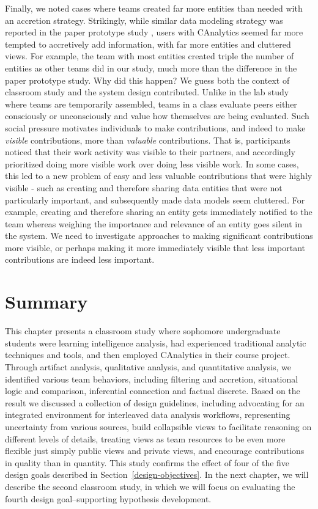 Finally, we noted cases where teams created far more entities than needed with an
accretion strategy. Strikingly, while similar data modeling strategy was
reported in the paper prototype study \citep{Carroll2013}, users with CAnalytics
seemed far more tempted to accretively add information, with far more entities
and cluttered views. For example, the team with most entities created triple the number of entities as 
other teams did in our study, much more than the difference
in the paper prototype study. Why did this happen? We guess both the context of
classroom study and the system design contributed. Unlike in the lab study where
teams are temporarily assembled, teams in a class evaluate peers either
consciously or unconsciously and value how themselves are being evaluated. Such
social pressure motivates individuals to make contributions, and indeed to make
\emph{visible} contributions, more than \emph{valuable} contributions. That is,
participants noticed that their work activity was visible to their partners, and
accordingly prioritized doing more visible work over doing less visible work. In
some cases, this led to a new problem of easy and less valuable contributions
that were highly visible - such as creating and therefore sharing data entities
that were not particularly important, and subsequently made data models seem
cluttered. For example, creating and therefore sharing an entity gets
immediately notified to the team whereas weighing the importance and relevance
of an entity goes silent in the system. We need to investigate approaches to
making significant contributions more visible, or perhaps making it more
immediately visible that less important contributions are indeed less important.


\section{Summary}
This chapter presents a classroom study where sophomore undergraduate students were learning intelligence analysis, had experienced traditional analytic techniques and tools, and then employed CAnalytics in their course project. Through artifact analysis, qualitative analysis, and quantitative analysis, we identified various team behaviors, including filtering and accretion, situational logic and comparison, inferential connection and factual discrete. Based on the result we discussed a collection of design guidelines, including advocating for an integrated environment for interleaved data analysis workflows, representing uncertainty from various sources, build collapsible views to facilitate reasoning on different levels of details, treating views as team resources to be even more flexible just simply public views and private views, and encourage contributions in quality than in quantity. This study confirms the effect of four of the five design goals described in Section~\ref{design-objectives}. In the next chapter, we will describe the second classroom study, in which we will focus on evaluating the fourth design goal--supporting hypothesis development.